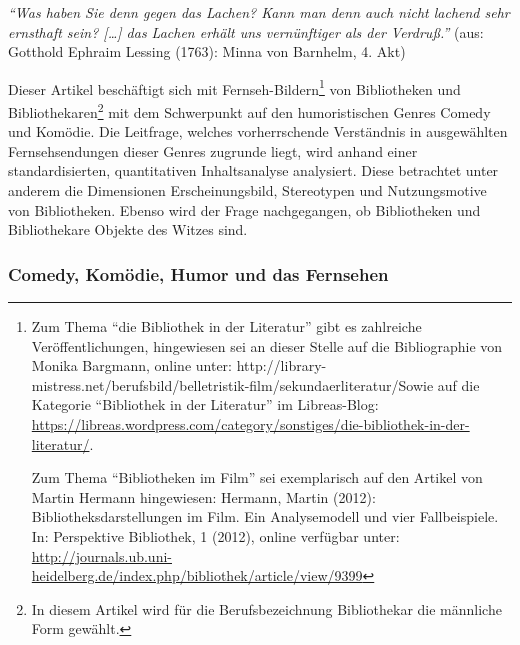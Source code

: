 \begin{small}
\emph{\enquote{Was haben Sie denn gegen das Lachen? Kann man denn auch
nicht lachend sehr ernsthaft sein? {[}\ldots{}{]} das Lachen erhält uns
vernünftiger als der Verdruß.}} (aus: Gotthold Ephraim Lessing (1763):
Minna von Barnhelm, 4. Akt)
\end{small}

Dieser Artikel beschäftigt sich mit Fernseh-Bildern\footnote{Zum Thema
  \enquote{die Bibliothek in der Literatur} gibt es zahlreiche
  Veröffentlichungen, hingewiesen sei an dieser Stelle auf die
  Bibliographie von Monika Bargmann, online unter:
  http://library-mistress.net/berufsbild/belletristik-film/sekundaerliteratur/Sowie
  auf die Kategorie \enquote{Bibliothek in der Literatur} im
  Libreas-Blog:
  \url{https://libreas.wordpress.com/category/sonstiges/die-bibliothek-in-der-literatur/}.

  Zum Thema \enquote{Bibliotheken im Film} sei exemplarisch auf den
  Artikel von Martin Hermann hingewiesen: Hermann, Martin (2012):
  Bibliotheksdarstellungen im Film. Ein Analysemodell und vier
  Fallbeispiele. In: Perspektive Bibliothek, 1 (2012), online verfügbar
  unter:
  \url{http://journals.ub.uni-heidelberg.de/index.php/bibliothek/article/view/9399}}
von Bibliotheken und Bibliothekaren\footnote{In diesem Artikel wird für
  die Berufsbezeichnung Bibliothekar die männliche Form gewählt.} mit
dem Schwerpunkt auf den humoristischen Genres Comedy und Komödie. Die
Leitfrage, welches vorherrschende Verständnis in ausgewählten
Fernsehsendungen dieser Genres zugrunde liegt, wird anhand einer
standardisierten, quantitativen Inhaltsanalyse analysiert. Diese
betrachtet unter anderem die Dimensionen Erscheinungsbild, Stereotypen
und Nutzungsmotive von Bibliotheken. Ebenso wird der Frage nachgegangen,
ob Bibliotheken und Bibliothekare Objekte des Witzes sind.

\subsubsection{Comedy, Komödie, Humor und das
Fernsehen}\label{comedy-komuxf6die-humor-und-das-fernsehen}

